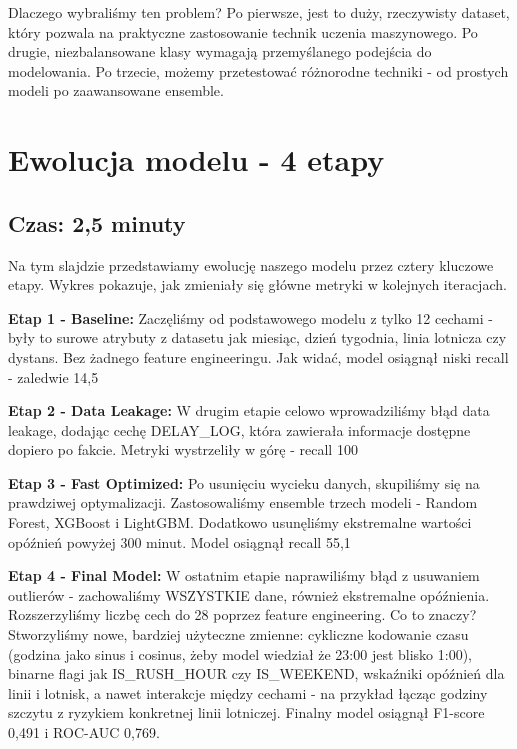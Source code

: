 \documentclass[12pt,a4paper]{article}
\begin{document}
Dlaczego wybraliśmy ten problem? Po pierwsze, jest to duży, rzeczywisty dataset, który pozwala na praktyczne zastosowanie technik uczenia maszynowego. Po drugie, niezbalansowane klasy wymagają przemyślanego podejścia do modelowania. Po trzecie, możemy przetestować różnorodne techniki - od prostych modeli po zaawansowane ensemble.

\section{Ewolucja modelu - 4 etapy}
\subsection{Czas: 2,5 minuty}

Na tym slajdzie przedstawiamy ewolucję naszego modelu przez cztery kluczowe etapy. Wykres pokazuje, jak zmieniały się główne metryki w kolejnych iteracjach.

\textbf{Etap 1 - Baseline:} Zaczęliśmy od podstawowego modelu z tylko 12 cechami - były to surowe atrybuty z datasetu jak miesiąc, dzień tygodnia, linia lotnicza czy dystans. Bez żadnego feature engineeringu. Jak widać, model osiągnął niski recall - zaledwie 14,5%

\textbf{Etap 2 - Data Leakage:} W drugim etapie celowo wprowadziliśmy błąd data leakage, dodając cechę DELAY\_LOG, która zawierała informacje dostępne dopiero po fakcie. Metryki wystrzeliły w górę - recall 100%

\textbf{Etap 3 - Fast Optimized:} Po usunięciu wycieku danych, skupiliśmy się na prawdziwej optymalizacji. Zastosowaliśmy ensemble trzech modeli - Random Forest, XGBoost i LightGBM. Dodatkowo usunęliśmy ekstremalne wartości opóźnień powyżej 300 minut. Model osiągnął recall 55,1%

\textbf{Etap 4 - Final Model:} W ostatnim etapie naprawiliśmy błąd z usuwaniem outlierów - zachowaliśmy WSZYSTKIE dane, również ekstremalne opóźnienia. Rozszerzyliśmy liczbę cech do 28 poprzez feature engineering. Co to znaczy? Stworzyliśmy nowe, bardziej użyteczne zmienne: cykliczne kodowanie czasu (godzina jako sinus i cosinus, żeby model wiedział że 23:00 jest blisko 1:00), binarne flagi jak IS\_RUSH\_HOUR czy IS\_WEEKEND, wskaźniki opóźnień dla linii i lotnisk, a nawet interakcje między cechami - na przykład łącząc godziny szczytu z ryzykiem konkretnej linii lotniczej. Finalny model osiągnął F1-score 0,491 i ROC-AUC 0,769.
\end{document}
